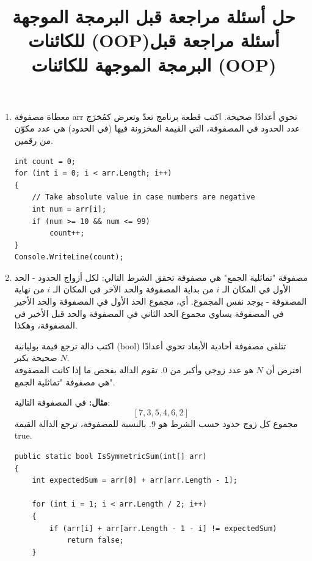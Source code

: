 \documentclass[14pt]{extarticle}
\title{حل أسئلة مراجعة قبل البرمجة الموجهة للكائنات (OOP)}
\title{أسئلة مراجعة قبل البرمجة الموجهة للكائنات (OOP)}
\begin{document}
\maketitle
\thispagestyle{fancy}

\begin{enumerate}[itemsep=3em]

\item
معطاة مصفوفة \textenglish{arr} تحوي أعدادًا صحيحة.
اكتب قطعة برنامج تعدّ وتعرض كمُخرَج عدد الحدود في المصفوفة، التي القيمة المخزونة فيها (في الحدود) هي عدد مكوّن من رقمين.

\ifwithsols
\begin{boxSolution}
\begin{english}
\begin{verbatim}
int count = 0;
for (int i = 0; i < arr.Length; i++)
{
    // Take absolute value in case numbers are negative
    int num = arr[i];
    if (num >= 10 && num <= 99)
        count++;
}
Console.WriteLine(count);
\end{verbatim}
\end{english}
\end{boxSolution}
\clearpage
\fi


\item
مصفوفة "تماثلية الجمع" هي مصفوفة تحقق الشرط التالي:
لكل أزواج الحدود - الحد الأول في المكان الـ $i$ من بداية المصفوفة والحد الآخر في المكان الـ $i$ من نهاية المصفوفة - يوجد نفس المجموع. أي، مجموع الحد الأول في المصفوفة والحد الأخير في المصفوفة يساوي مجموع الحد الثاني في المصفوفة والحد قبل الأخير في المصفوفة، وهكذا.

اكتب دالة ترجع قيمة بوليانية (\textenglish{bool}) تتلقى مصفوفة أحادية الأبعاد تحوي أعدادًا صحيحة بكبر $N$. \\
افترض أن $N$ هو عدد زوجي وأكبر من $0$. تقوم الدالة بفحص ما إذا كانت المصفوفة هي مصفوفة "تماثلية الجمع".

\textbf{مثال:} في المصفوفة التالية:
$$ [7, 3, 5, 4, 6, 2] $$
مجموع كل زوج حدود حسب الشرط هو 9. بالنسبة للمصفوفة، ترجع الدالة القيمة \textenglish{true}.

\ifwithsols
\begin{boxSolution}
\begin{english}
\begin{verbatim}
public static bool IsSymmetricSum(int[] arr)
{
    int expectedSum = arr[0] + arr[arr.Length - 1];

    for (int i = 1; i < arr.Length / 2; i++)
    {
        if (arr[i] + arr[arr.Length - 1 - i] != expectedSum)
            return false;
    }


\end{verbatim}
\end{english}
\end{boxSolution}
\end{enumerate}
\end{document}
